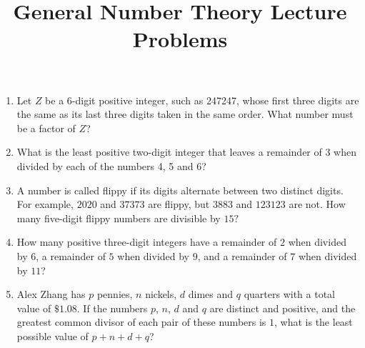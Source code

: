 \documentclass{article}
\title{General Number Theory Lecture Problems}
\date{}
\author{}
\begin{document}
\maketitle
\begin{enumerate}
    \item Let $Z$ be a 6-digit positive integer, such as 247247, whose first three digits are the same as its last three digits taken in the same order. 
        What number must be a factor of $Z$?
        \vspace{3cm}
    \item What is the least positive two-digit integer that leaves a remainder of 3 when divided by
        each of the numbers 4, 5 and 6?
        \vspace{3cm}
    \item A number is called flippy if its digits alternate between two distinct digits. 
        For example, $2020$ and $37373$ are flippy, but $3883$ and $123123$ are not. 
        How many five-digit flippy numbers are divisible by $15?$
        \vspace{3cm}
    \item How many positive three-digit integers have a remainder of $2$ when divided by $6$, 
        a remainder of $5$ when divided by $9$, and a remainder of $7$ when divided by $11$?
        \vspace{3cm}
    \item Alex Zhang has $p$ pennies, $n$ nickels, $d$ dimes and $q$ quarters with a total value of $\$1.08$.
        If the numbers $p$, $n$, $d$ and $q$ are distinct and positive, and the greatest common divisor of each 
        pair of these numbers is $1$, what is the least possible value of $p + n + d + q$?
        \vspace{3cm}
\end{enumerate}
\end{document}
